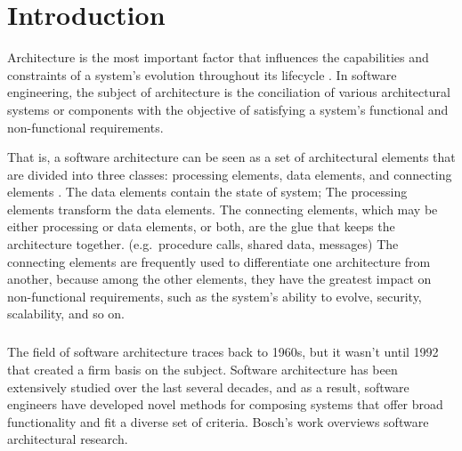 
%

\chapter{Introduction}
\label{cha:introduction}

Architecture is the most important factor that influences the capabilities and constraints of a system's evolution throughout its lifecycle \cite{Breivold2012}.
In software engineering, the subject of architecture is the conciliation of various architectural systems or components
with the objective of satisfying a system's functional and non-functional requirements.

That is, a software architecture can be seen as a set of architectural elements that are divided into three classes: processing elements, data elements, and connecting elements \cite{architecture}.
The data elements contain the state of system;
The processing elements transform the data elements.
The connecting elements, which may be either processing or data elements, or both, are the glue that keeps the architecture together.
(e.g.\ procedure calls, shared data, messages)
The connecting elements are frequently used to differentiate one architecture from another,
because among the other elements, they have the greatest impact on non-functional requirements, such as the system's ability to evolve, security, scalability, and so on.

\paragraph{}

The field of software architecture traces back to 1960s, but it wasn't until 1992 that \citeauthor{architecture} \cite{architecture} created a firm basis on the subject.
Software architecture has been extensively studied over the last several decades, and as a result,
software engineers have developed novel methods for composing systems that offer broad functionality and fit a diverse set of criteria.
Bosch's work \cite{3, 4} overviews software architectural research.

\paragraph{}

